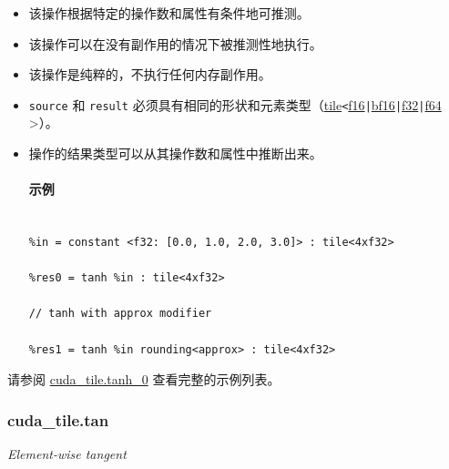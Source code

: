 \documentclass{article}
\begin{document}
\begin{itemize}
\item 该操作根据特定的操作数和属性有条件地可推测。
\item 该操作可以在没有副作用的情况下被推测性地执行。
\item 该操作是纯粹的，不执行任何内存副作用。
\item \texttt{source} 和 \texttt{result} 必须具有相同的形状和元素类型（\href{https://docs.nvidia.com/cuda/tile-ir/latest/sections/types.html#type-tile}{tile}\texttt{<}\href{https://docs.nvidia.com/cuda/tile-ir/latest/sections/types.html#subsection-element-types}{f16}\texttt{|}\href{https://docs.nvidia.com/cuda/tile-ir/latest/sections/types.html#subsection-element-types}{bf16}\texttt{|}\href{https://docs.nvidia.com/cuda/tile-ir/latest/sections/types.html#subsection-element-types}{f32}\texttt{|}\href{https://docs.nvidia.com/cuda/tile-ir/latest/sections/types.html#subsection-element-types}{f64} >）。
\item 操作的结果类型可以从其操作数和属性中推断出来。




\paragraph{示例}


\begin{lstlisting}

%in = constant <f32: [0.0, 1.0, 2.0, 3.0]> : tile<4xf32>

%res0 = tanh %in : tile<4xf32>

// tanh with approx modifier

%res1 = tanh %in rounding<approx> : tile<4xf32>

\end{lstlisting}



\end{itemize}
请参阅 \href{https://docs.nvidia.com/cuda/tile-ir/latest/sections/appendix.html#example-cuda-tile-tanh-0}{cuda\_tile.tanh\_0} 查看完整的示例列表。





\subsubsection{cuda\_tile.tan}


\textit{Element-wise tangent}
\end{document}
